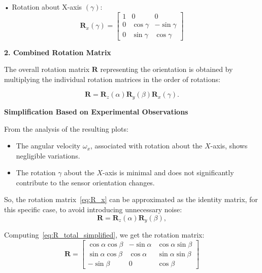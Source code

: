 \documentclass[12pt]{article}
\begin{document}
• Rotation about X-axis \((\gamma)\):
\begin{equation}
\label{eq:R_x}
\mathbf{R}_x(\gamma) =
\begin{bmatrix}
1 & 0 & 0 \\
0 & \cos\gamma & -\sin\gamma \\
0 & \sin\gamma & \cos\gamma
\end{bmatrix}
\end{equation}


\textbf{2. Combined Rotation Matrix}

The overall rotation matrix $\mathbf{R}$ representing the orientation is obtained by multiplying the individual rotation matrices in the order of rotations:

\begin{equation}
\label{eq:R_total}
\mathbf{R} = \mathbf{R}_z(\alpha) \mathbf{R}_y(\beta) \mathbf{R}_x(\gamma) .
\end{equation}

\vspace{0.5cm}

\textbf{Simplification Based on Experimental Observations}

From the analysis of the resulting plots:
\begin{itemize}
    \item The angular velocity \(\omega_x\), associated with rotation about the \(X\)-axis, shows negligible variations.
    \item The rotation \(\gamma\) about the \(X\)-axis is minimal and does not significantly contribute to the sensor orientation changes.
\end{itemize}

So, the rotation matrix~\ref{eq:R_x} can be approximated as the identity matrix, for this specific case, to avoid introducing unnecessary noise:
\begin{equation}
\label{eq:R_total_simplified}
\mathbf{R} = \mathbf{R}_z(\alpha) \mathbf{R}_y(\beta) ,
\end{equation}


Computing~\ref{eq:R_total_simplified}, we get the rotation matrix:
\begin{equation}
\label{eq:Rotation_matrix_final}
\mathbf{R} =
\begin{bmatrix}
\cos\alpha \cos\beta & -\sin\alpha & \cos\alpha \sin\beta \\
\sin\alpha \cos\beta & \cos\alpha & \sin\alpha \sin\beta \\
-\sin\beta & 0 & \cos\beta
\end{bmatrix}
\end{equation}
\end{document}
